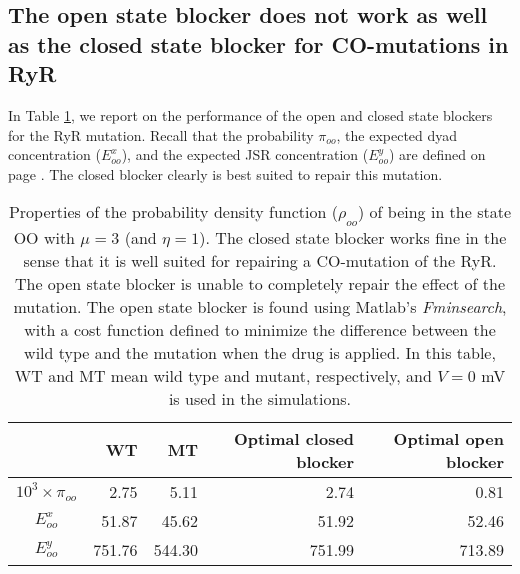 \subsection{The open state blocker does not work as well as the closed state blocker for CO-mutations in RyR}

In Table \ref{ryr_ob},  we report on the performance of the open and closed state blockers for the RyR mutation. Recall that the probability $\pi_{oo}$, the expected dyad concentration ($E^x_{oo}$), and the expected JSR concentration ($E^y_{oo}$) are defined on page \pageref{statistics}.  The closed blocker clearly is best suited to repair this mutation.





\begin{table}  \begin{center}
\begin{tabular}{|c|r|r|r|r|} \hline
&WT & MT & Optimal closed blocker & Optimal open blocker \\ \hline
$10^3\times\pi_{oo}$&2.75 & 5.11 & 2.74 & 0.81 \\ \hline
$E^x_{oo}$&51.87 & 45.62 & 51.92 & 52.46 \\ \hline
$E^y_{oo}$&751.76 & 544.30 & 751.99 & 713.89 \\ \hline
\end{tabular} \end{center}
\caption{Properties of the probability density function ($\rho_{oo}$) of being in the state OO with $\mu=3$ (and  $\eta=1$). The closed state blocker works fine in the sense that it is well suited for repairing a CO-mutation of the RyR.
The  open state blocker is unable to completely repair the effect of the mutation. The open state blocker is found using Matlab's {\it Fminsearch},
with a cost function defined to minimize the difference between the wild type and the mutation when the drug is applied.
In this table, WT and MT mean wild type and mutant, respectively, and  $V=0$ mV is used in the simulations.
} \label{ryr_ob}
\end{table}




